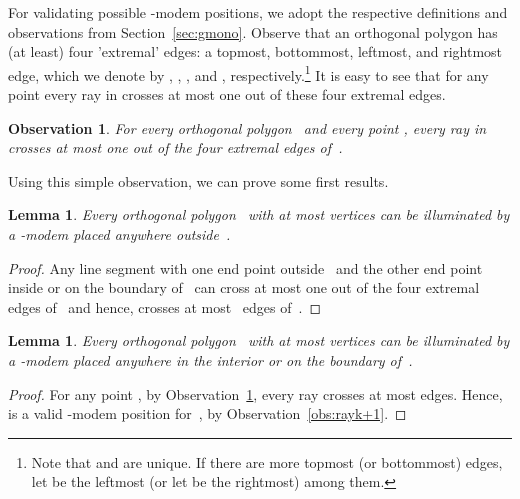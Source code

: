 \documentclass[A4]{article}
\newtheorem{lemma}[theorem]{Lemma}
\newtheorem{observation}[theorem]{Observation}
\begin{document}
For validating possible \mbox{-modem} positions, we adopt the respective definitions and observations from Section~\ref{sec:gmono}.
Observe that an orthogonal polygon has (at least) four 'extremal' edges: a topmost, bottommost, leftmost, and rightmost edge, which we denote by , , , and , respectively.\footnote{Note that  and  are unique. If there are more topmost (or bottommost) edges,  let  be the leftmost  (or let  be the rightmost) among them. }
It is easy to see that for any point  every ray in  crosses at most one out of these four extremal edges.

\begin{observation}\label{obs:extremal}
For every orthogonal polygon~ and every point , every ray in  crosses at most one out of the four extremal edges of~.
\end{observation}

Using this simple observation, we can prove some first results.

\begin{lemma}\label{lem:k+3}
  Every orthogonal polygon~ with at most  vertices can be illuminated by a \mbox{-modem} placed anywhere outside~.
\end{lemma}
\begin{proof}
  Any line segment with one end point outside~ and the other end point inside or on the boundary of~ can cross at most one out of the four extremal edges of~ and hence, crosses at most~ edges of~. \end{proof}


\begin{lemma}\label{lem:k+4}
Every orthogonal polygon~ with at most  vertices can be illuminated by a \mbox{-modem} placed anywhere in the interior or on the boundary of~.
\end{lemma}
\begin{proof}
For any point , by Observation~\ref{obs:extremal}, every ray  crosses at most  edges.
Hence,  is a valid \mbox{-modem} position for~, by Observation~\ref{obs:rayk+1}. \end{proof}
\end{document}
